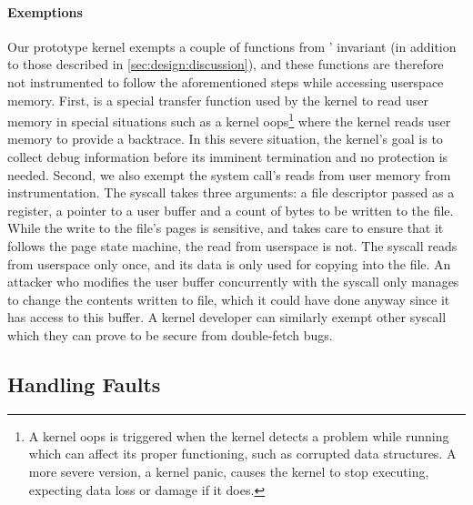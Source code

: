 \paragraph{Exemptions}
Our prototype \midas kernel exempts a couple of functions
from \midas' invariant (in addition to those described in
\autoref{sec:design:discussion}), and these functions are
therefore not instrumented
to follow the aforementioned steps while accessing userspace
memory.
First,  is a special
transfer function used by the kernel to
read user memory in special situations such as a kernel
oops\footnote{A kernel oops is triggered when the kernel detects a
problem while running which can affect its proper functioning, such
as corrupted data structures.
A more severe version, a kernel panic, causes the kernel to stop
executing, expecting data loss or damage if it does.}
where the kernel reads user memory to provide a backtrace.
In this severe situation, the kernel's goal is to collect debug
information before its imminent termination and no \tocttou protection
is needed.
Second, we also exempt the  system
call's reads from user memory from instrumentation.
The  syscall takes three arguments: a
file descriptor passed as a register, a pointer to a user
buffer and a count of bytes to be written to the file.
While the write to the file's pages is sensitive, and
\midas takes care to ensure that it follows the page state
machine, the read from userspace is not.
The syscall reads from userspace only once, and its data
is only used for copying into the file.
An attacker who modifies the user buffer concurrently with
the syscall only manages to change the contents written to
file, which it could have done anyway since it has access to
this buffer.
A kernel developer can similarly exempt other syscall which
they can prove to be secure from double-fetch bugs.


\subsection{Handling Faults}

